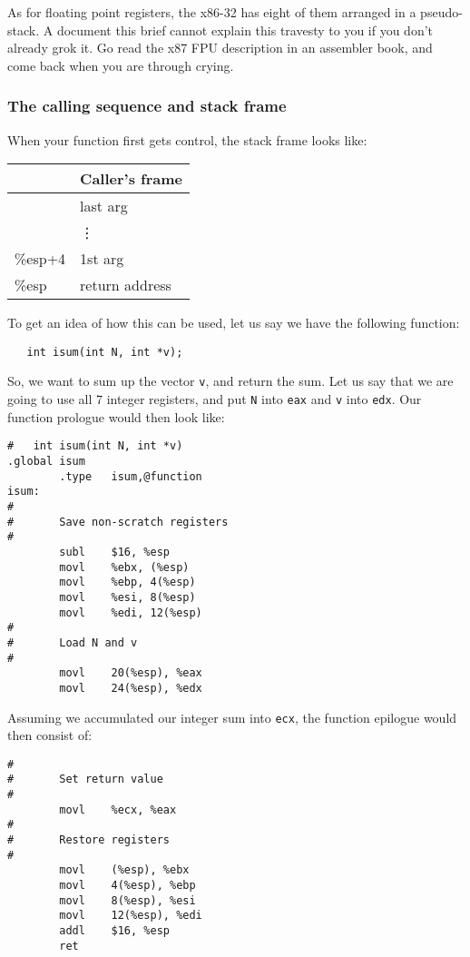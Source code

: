 \documentclass[11pt]{article}
\begin{document}
As for floating point registers, the x86-32 has eight of them arranged
in a pseudo-stack.  A document this brief cannot explain this travesty to
you if you don't already grok it.  Go read the x87 FPU description in an
assembler book, and come back when you are through crying.

\subsubsection{The calling sequence and stack frame}
When your function first gets control, the stack frame looks like: \\
\begin{center}
\begin{tabular}{l|l|}
        & Caller's frame \\\hline
        & last arg \\\hline
        & \vdots \\\hline
\%esp+4 & 1st arg \\\hline
\%esp & return address \\\hline
\end{tabular}
\end{center}

To get an idea of how this can be used, let us say we have the following
function:
\begin{verbatim}
   int isum(int N, int *v);
\end{verbatim}

So, we want to sum up the vector {\tt v}, and return the sum.  Let us say
that we are going to use all 7 integer registers, and put {\tt N} into
{\tt eax} and {\tt v} into {\tt edx}.  Our function prologue would then look
like:
\begin{verbatim}
#   int isum(int N, int *v)
.global isum
        .type   isum,@function
isum:
#
#       Save non-scratch registers
#
        subl    $16, %esp
        movl    %ebx, (%esp)
        movl    %ebp, 4(%esp)
        movl    %esi, 8(%esp)
        movl    %edi, 12(%esp)
#
#       Load N and v
#
        movl    20(%esp), %eax
        movl    24(%esp), %edx
\end{verbatim}

Assuming we accumulated our integer sum into {\tt ecx}, the function epilogue
would then consist of:
\begin{verbatim}
#
#       Set return value
#
        movl    %ecx, %eax
#
#       Restore registers
#
        movl    (%esp), %ebx
        movl    4(%esp), %ebp
        movl    8(%esp), %esi
        movl    12(%esp), %edi
        addl    $16, %esp
        ret
\end{verbatim}
\end{document}
